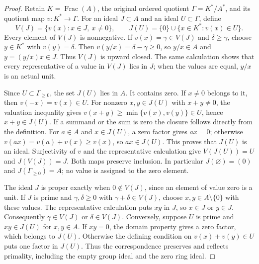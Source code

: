 \begin{proof}
Retain $K=\operatorname{Frac}(A)$, the original ordered quotient
$\Gamma=K^*/A^*$, and its quotient map $v:K^*\to\Gamma$.
For an ideal $J\subset A$ and an ideal $U\subset\Gamma$, define
$$
V(J)=\{v(x):x\in J,\ x\neq0\},\qquad
J(U)=\{0\}\cup\{x\in K^*:v(x)\in U\}.
$$
Every element of $V(J)$ is nonnegative. If $v(x)=\gamma\in V(J)$
and $\delta\geq\gamma$, choose $y\in K^*$ with $v(y)=\delta$.
Then $v(y/x)=\delta-\gamma\geq0$, so $y/x\in A$ and
$y=(y/x)x\in J$. Thus $V(J)$ is upward closed.
The same calculation shows that every representative of a value in
$V(J)$ lies in $J$; when the values are equal, $y/x$ is an actual unit.

Since $U\subset\Gamma_{\geq0}$, the set $J(U)$ lies in $A$.
It contains zero. If $x\neq0$ belongs to it, then
$v(-x)=v(x)\in U$. For nonzero $x,y\in J(U)$ with $x+y\neq0$,
the valuation inequality gives
$v(x+y)\geq\min\{v(x),v(y)\}\in U$, hence $x+y\in J(U)$.
If a summand or the sum is zero the closure follows directly from
the definition. For $a\in A$ and $x\in J(U)$, a zero factor gives
$ax=0$; otherwise $v(ax)=v(a)+v(x)\geq v(x)$, so $ax\in J(U)$.
This proves that $J(U)$ is an ideal.
Surjectivity of $v$ and the representative calculation give
$V(J(U))=U$ and $J(V(J))=J$. Both maps preserve inclusion.
In particular $J(\varnothing)=(0)$ and
$J(\Gamma_{\geq0})=A$; no value is assigned to the zero element.

The ideal $J$ is proper exactly when $0\notin V(J)$, since an
element of value zero is a unit. If $J$ is prime and
$\gamma,\delta\geq0$ with $\gamma+\delta\in V(J)$, choose
$x,y\in A\setminus\{0\}$ with these values. The representative
calculation puts $xy$ in $J$, so $x\in J$ or $y\in J$.
Consequently $\gamma\in V(J)$ or $\delta\in V(J)$.
Conversely, suppose $U$ is prime and $xy\in J(U)$ for $x,y\in A$.
If $xy=0$, the domain property gives a zero factor, which belongs
to $J(U)$. Otherwise the defining condition on
$v(x)+v(y)\in U$ puts one factor in $J(U)$.
Thus the correspondence preserves and reflects primality, including
the empty group ideal and the zero ring ideal.


\end{proof}
